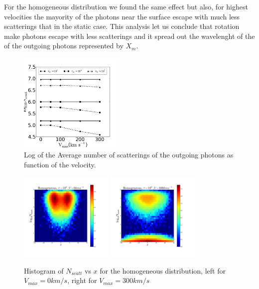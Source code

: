 \documentclass[usenatbib]{mn2e}
\begin{document}
For the homogeneous distribution we found the same effect but also, for 
highest velocities the mayority of the photons near the surface escape 
with much less scatterings that in the static case. This analysis let us 
conclude that rotation make photons escape with less scatterings and it 
spread out the wavelenght of the of the outgoing photons represented by $X_{m}$.


\begin{figure}
    \includegraphics[width=0.45\textwidth]{NscattvsVmax.png}
\caption{Log of the Average number of scatterings of the outgoing photons as function of the velocity. \label{fig:Nscatt}} 
\end{figure}


\begin{figure}
     \includegraphics[width=0.40\textwidth]{2dHistogram0t5HOM.png}
     \includegraphics[width=0.40\textwidth]{2dHistogram300t5HOM.png}
    
    \caption{Histogram of $N_{scatt}$ vs $x$ for the homogeneous distribution, left for $V_{max}=0km/s $, right for $V_{max}=300km/s$ \label{fig:NscattHistoHOM}} 
\end{figure}
\end{document}
